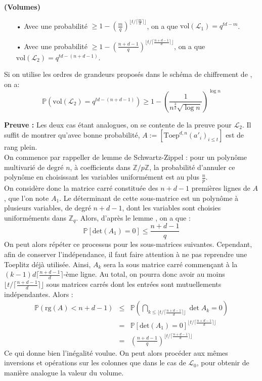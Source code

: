 \documentclass[11pt,a4paper]{article}
\begin{document}
\begin{theorem}\textbf{(Volumes) \\}
\begin{itemize}
\item[•] Avec une probabilité $\geq 1 - (\frac{m}{q})^{\lfloor t/\lceil\frac{m}{d}\rceil\rfloor}$, on a que $\text{vol}(\mathcal{L}_1)=q^{td-m}$.
\item[•] Avec une probabilité $\geq 1 - (\frac{n+d-1}{q})^{\lfloor t/\lceil\frac{n+d-1}{d}\rceil\rfloor}$, on a que $\text{vol}(\mathcal{L}_2)=q^{td-(n+d-1)}$. \\
\end{itemize}
Si on utilise les ordres de grandeurs proposés dans le schéma de chiffrement de \cite{mplwe}, on a:  \[\mathbb{P}(\text{vol}(\mathcal{L}_{2})=q^{td-(n+d-1)}) \geq 1 - (\frac{1}{n^\frac{3}{2}\sqrt{\log{n}}})^{\log{n}}\]
\end{theorem}
\textbf{Preuve :} Les deux cas étant analogues, on se contente de la preuve pour $\mathcal{L}_2$. Il suffit de montrer qu'avec bonne probabilité, $A:=[\text{Toep}^{d,n}(a'_i)_{i\leq t}]$ est de rang plein. \\
On commence par rappeller de lemme de Schwartz-Zippel : pour un polynôme multivarié de degré $n$, à coefficients dans $\mathbb{Z}/p\mathbb{Z}$, la probabilité d'annuler ce polynôme en choisissant les variables uniformément est au plus $\frac{n}{p}$. \\
On considère donc la matrice carré constituée des $n+d-1$ premières lignes de $A$, que l'on note $A_1$. Le déterminant de cette sous-matrice est un polynôme à plusieurs variables, de degré $n+d-1$, dont les variables sont choisies uniforméments dans $\mathbb{Z}_q$. Alors, d'après le lemme , on a que : \[\mathbb{P}[\text{det}(A_1)=0] \leq \frac{n+d-1}{q}\]
On peut alors répéter ce processus pour les sous-matrices suivantes. Cependant, afin de conserver l'indépendance, il faut faire attention à ne pas reprendre une Toeplitz déjà utilisée. Ainsi, $A_k$ sera la sous matrice carré commençant à la $ (k-1)d\lceil \frac{n+d-1}{d} \rceil $-ème ligne. Au total, on pourra donc avoir au moins $\lfloor t/\lceil\frac{n+d-1}{d}\rceil\rfloor$ sous matrices carrés dont les entrées sont mutuellements indépendantes. Alors : 
\begin{eqnarray*}
\mathbb{P}(\text{rg}(A)<n+d-1) &\leq& \mathbb{P}(\bigcap_{k\leq\lfloor t/\lceil\frac{n+d-1}{d}\rceil\rfloor} \det{A_k} = 0) \\
&=&\mathbb{P}[\text{det}(A_1)=0]^{\lfloor t/\lceil\frac{n+d-1}{d}\rceil\rfloor} \\
&=&  (\frac{n+d-1}{q})^{\lfloor t/\lceil\frac{n+d-1}{d}\rceil\rfloor}
\end{eqnarray*}
Ce qui donne bien l'inégalité voulue.
On peut alors procéder aux mêmes inversions et opérations sur les colonnes que dans le cas de $\mathcal{L}_0$, pour obtenir de manière analogue la valeur du volume.
\end{document}
